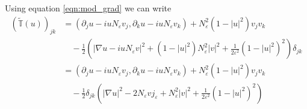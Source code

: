 \documentclass[a4paper]{article}
\begin{document}

Using equation \eqref{eqn:mod_grad} we can write
\begin{align}
  (\tilde{\mathbb{T}}(u))_{jk} &= ( \partial_j u - i u N_\varepsilon v_j, \partial_k u - iu N_\varepsilon v_k) + N_\varepsilon^2(1-|u|^2)v_j v_k
  \nonumber \\
  &\quad - \frac{1}{2} \left( |\nabla u - iu N_\varepsilon v|^2 + (1-|u|^2) N_\varepsilon^2 |v|^2 + \frac{1}{2 \varepsilon^2} (1-|u|^2)^2 \right)
  \delta_{jk} \nonumber \\
  &= (\partial_j u - i u N_\varepsilon v_j, \partial_k u - i u N_\varepsilon v_k ) + N_\varepsilon^2(1-|u|^2) v_j v_k \nonumber \\
  &\quad -\frac{1}{2} \delta_{jk} \left( |\nabla u|^2 - 2N_\varepsilon v j_\varepsilon + N_\varepsilon^2 |v|^2 + \frac{1}{2 \varepsilon^2} (1-|u|^2)^2 \right)
  \label{eqn:mod_stress_energy2}
\end{align}
\end{document}
